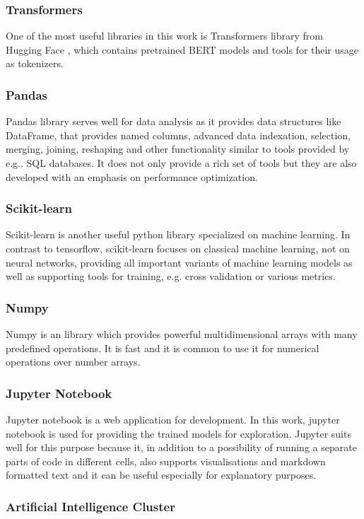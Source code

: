 \subsubsection{Transformers} 
One of the most useful libraries in this work is Transformers library from Hugging Face \citep{Wolf2019HuggingFacesTS}, which contains pretrained BERT models and tools for their usage as tokenizers.
\subsubsection{Pandas}
Pandas library \citep{reback2020pandas} serves well for data analysis as it provides data structures like DataFrame, that provides named columns, advanced data indexation, selection, merging, joining, reshaping and other functionality similar to tools provided by e.g.. SQL databases. It does not only provide a rich set of tools but they are also developed with an emphasis on performance optimization.
\subsubsection{Scikit-learn}
Scikit-learn \citep{scikit-learn}  is another useful python library specialized on machine learning. In contrast to tensorflow, scikit-learn focuses on classical machine learning, not on neural networks, providing all important variants of machine learning models as well as supporting tools for training, e.g. cross validation or various metrics.
\subsubsection{Numpy}
Numpy \citep{harris2020array} is an library which provides powerful multidimensional arrays with many predefined operations. It is fast and it is common to use it for numerical operations over number arrays.
\subsubsection{Jupyter Notebook}
Jupyter notebook \citep{jupyter} is a web application for development. In this work, jupyter notebook is used for providing the trained models for exploration. %
Jupyter suits well for this purpose because it, in addition to a possibility of running a separate parts of code in different cells, also supports visualisations and markdown formatted text and it can be useful especially for explanatory purposes.
\subsubsection{Artificial Intelligence Cluster}
